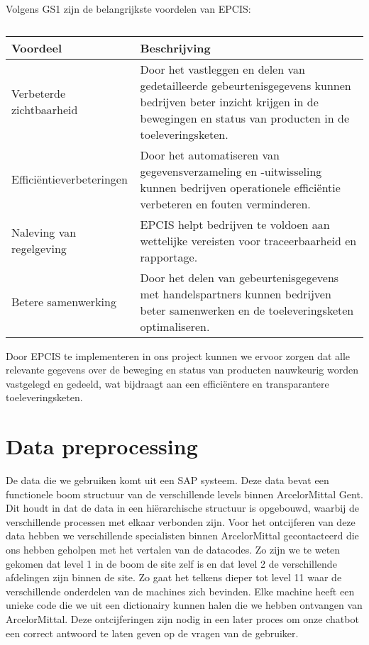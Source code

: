 Volgens GS1 \autocite{GS12025} zijn de belangrijkste voordelen van EPCIS:
\begin{table}[H]
    \centering
     \begin{tabular}{lp{}}
          \toprule
          \textbf{Voordeel} & \textbf{Beschrijving} \\
          \toprule
          Verbeterde zichtbaarheid & Door het vastleggen en delen van gedetailleerde gebeurtenisgegevens kunnen bedrijven beter inzicht krijgen in de bewegingen en status van producten in de toeleveringsketen. \\
          \midrule
          Efficiëntieverbeteringen & Door het automatiseren van gegevensverzameling en -uitwisseling kunnen bedrijven operationele efficiëntie verbeteren en fouten verminderen. \\
          \midrule
          Naleving van regelgeving & EPCIS helpt bedrijven te voldoen aan wettelijke vereisten voor traceerbaarheid en rapportage. \\
          \midrule
          Betere samenwerking & Door het delen van gebeurtenisgegevens met handelspartners kunnen bedrijven beter samenwerken en de toeleveringsketen optimaliseren. \\
          \bottomrule
     \end{tabular}
     \caption[Belangrijkste voordelen van EPCIS volgens GS1]{\label{tab:epcis-voordelen}}
\end{table}

Door EPCIS te implementeren in ons project kunnen we ervoor zorgen dat alle relevante gegevens over de beweging en status van producten nauwkeurig worden vastgelegd en gedeeld, wat bijdraagt aan een efficiëntere en transparantere toeleveringsketen.

\section{Data preprocessing}
De data die we gebruiken komt uit een SAP systeem. Deze data bevat een functionele boom structuur van de verschillende levels binnen ArcelorMittal Gent.
Dit houdt in dat de data in een hiërarchische structuur is opgebouwd, waarbij de verschillende processen met elkaar verbonden zijn.
Voor het ontcijferen van deze data hebben we verschillende specialisten binnen ArcelorMittal gecontacteerd die ons hebben geholpen met het vertalen van de datacodes.
Zo zijn we te weten gekomen dat level 1 in de boom de site zelf is en dat level 2 de verschillende afdelingen zijn binnen de site. Zo gaat het telkens dieper tot level 11 waar de verschillende onderdelen van de machines zich bevinden.
Elke machine heeft een unieke code die we uit een dictionairy kunnen halen die we hebben ontvangen van ArcelorMittal.
Deze ontcijferingen zijn nodig in een later proces om onze chatbot een correct antwoord te laten geven op de vragen van de gebruiker.

